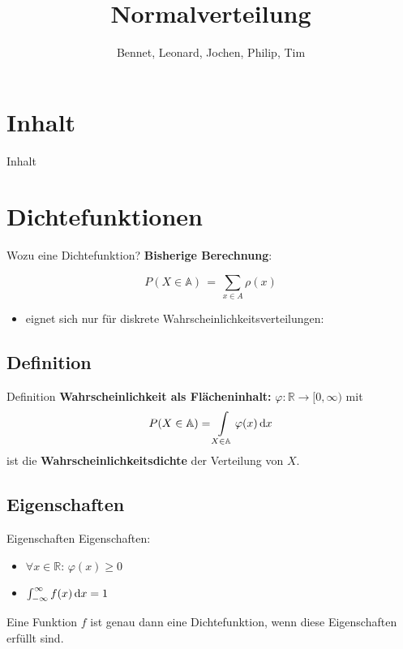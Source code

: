 \documentclass[14pt]{beamer}
\author{Bennet, Leonard, Jochen, Philip, Tim}
\title{Normalverteilung}
\institute{Herder Gymnasium Berlin}
\date{}
\begin{document}
\begin{frame}
 \titlepage
\end{frame}

\section{Inhalt}
\begin{frame}[allowframebreaks]{Inhalt}
 \tableofcontents
\end{frame}

\section{Dichtefunktionen}
\begin{frame}{Wozu eine Dichtefunktion?}
\textbf{Bisherige Berechnung}:

{\small $$ P(X \in\mathbb{A}) \, = \, \sum_{x\in A} \rho(x) $$}
\begin{itemize}

\item eignet sich nur für diskrete Wahrscheinlichkeitsverteilungen:

\begin{itemize}
\end{itemize}
\end{itemize}

\end{frame}

\subsection{Definition}
\begin{frame}{Definition}
\textbf{Wahrscheinlichkeit als Flächeninhalt:}
$\varphi \colon \mathbb{R} \rightarrow [0,\infty)$ mit
$$P(X \in \mathbb{A})=\int\displaylimits_{X \in \mathbb{A}} \varphi(x)\,{\mathrm d}x$$
ist die \textbf{Wahrscheinlichkeitsdichte} der Verteilung von $X$.
\end{frame}

\subsection{Eigenschaften}
\begin{frame}{Eigenschaften}
Eigenschaften:
\begin{itemize}
\item $\forall x \in \mathbb{R}:\, \varphi(x)\geq 0$
\item $\int\displaylimits_{-\infty}^\infty f(x)\,{\mathrm d}x = 1$
\end{itemize}
Eine Funktion $f$ ist genau dann eine Dichtefunktion, wenn diese Eigenschaften erfüllt sind.
\end{frame}
\end{document}
